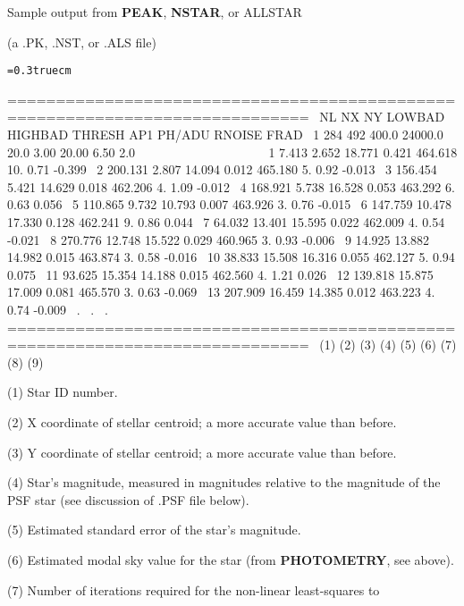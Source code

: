 \centerline{Sample output from {\bf PEAK}, {\bf NSTAR}, or ALLSTAR}
\centerline {(a .PK, .NST, or .ALS file)}
\bigskip
{\noindent\obeylines\obeyspaces\frenchspacing\tt\baselineskip=0.3truecm

=============================================================================
\ NL   NX   NY  LOWBAD HIGHBAD  THRESH     AP1  PH/ADU  RNOISE    FRAD
\  1  284  492   400.0 24000.0    20.0    3.00   20.00    6.50     2.0
~~~~~~~~~~~~~~~~~~~
\    1    7.413    2.652   18.771    0.421  464.618      10.     0.71   -0.399
\    2  200.131    2.807   14.094    0.012  465.180       5.     0.92   -0.013
\    3  156.454    5.421   14.629    0.018  462.206       4.     1.09   -0.012
\    4  168.921    5.738   16.528    0.053  463.292       6.     0.63    0.056
\    5  110.865    9.732   10.793    0.007  463.926       3.     0.76   -0.015
\    6  147.759   10.478   17.330    0.128  462.241       9.     0.86    0.044
\    7   64.032   13.401   15.595    0.022  462.009       4.     0.54   -0.021
\    8  270.776   12.748   15.522    0.029  460.965       3.     0.93   -0.006
\    9   14.925   13.882   14.982    0.015  463.874       3.     0.58   -0.016
\   10   38.833   15.508   16.316    0.055  462.127       5.     0.94    0.075
\   11   93.625   15.354   14.188    0.015  462.560       4.     1.21    0.026
\   12  139.818   15.875   17.009    0.081  465.570       3.     0.63   -0.069
\   13  207.909   16.459   14.385    0.012  463.223       4.     0.74   -0.009
\                                       .
\                                       .
\                                       .
=============================================================================
\   (1)    (2)      (3)      (4)      (5)     (6)        (7)     (8)      (9)
}
\item{(1)} Star ID number.
\item{(2)} X coordinate of stellar centroid; a more accurate value than before.
\item{(3)} Y coordinate of stellar centroid; a more accurate value than before.
\item{(4)} Star's magnitude, measured in magnitudes relative to the magnitude 
of the PSF star (see discussion of .PSF file below).
\item{(5)} Estimated standard error of the star's magnitude.
\item{(6)} Estimated modal sky value for the star (from {\bf PHOTOMETRY}, 
see above).
\item{(7)} Number of iterations required for the non-linear least-squares to
